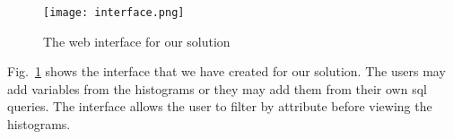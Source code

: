 \begin{figure}[h]
\texttt{[image: interface.png]}
\caption{The web interface for our solution}
\label{fig:interface}
\end{figure}

Fig.~\ref{fig:interface} shows the interface that we have created for our solution. The users may add variables from the histograms or they may add them from their own sql queries. The interface allows the user to filter by attribute before viewing the histograms.
